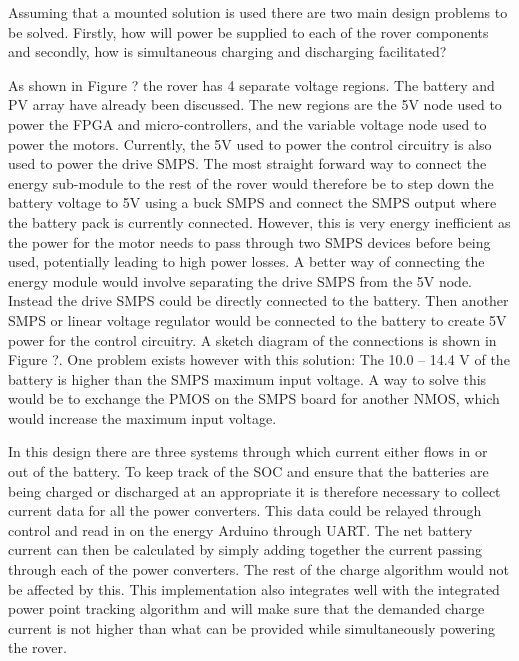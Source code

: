 \documentclass[a4paper]{article}
\begin{document}
Assuming that a mounted solution is used there are two main design problems 
to be solved. Firstly, how will power be supplied to each of the rover components 
and secondly, how is simultaneous charging and discharging facilitated?

As shown in Figure ? the rover has 4 separate voltage regions. The battery and 
PV array have already been discussed. The new regions are the 5V node used to power 
the FPGA and micro-controllers, and the variable voltage node used to power the 
motors. Currently, the 5V used to power the control circuitry is also used to power 
the drive SMPS. The most straight forward way to connect the energy sub-module to 
the rest of the rover would therefore be to step down the battery voltage to 5V 
using a buck SMPS and connect the SMPS output where the battery pack is currently 
connected. However, this is very energy inefficient as the power for the motor needs 
to pass through two SMPS devices before being used, potentially leading to high power 
losses. A better way of connecting the energy module would involve separating the 
drive SMPS from the 5V node. Instead the drive SMPS could be directly connected to 
the battery. Then another SMPS or linear voltage regulator would be connected to the 
battery to create 5V power for the control circuitry. A sketch diagram of the 
connections is shown in Figure ?. One problem exists however with this solution: 
The 10.0 – 14.4 V of the battery is higher than the SMPS maximum input voltage. 
A way to solve this would be to exchange the PMOS on the SMPS board for another NMOS, 
which would increase the maximum input voltage.

In this design there are three systems through which current either flows in or 
out of the battery. To keep track of the SOC and ensure that the batteries are 
being charged or discharged at an appropriate it is therefore necessary to collect
current data for all the power converters. This data could be relayed through control 
and read in on the energy Arduino through UART. The net battery current can then be 
calculated by simply adding together the current passing through each of the power 
converters. The rest of the charge algorithm would not be affected by this. This 
implementation also integrates well with the integrated power point tracking algorithm 
and will make sure that the demanded charge current is not higher than what can be 
provided while simultaneously powering the rover.

\end{document}
